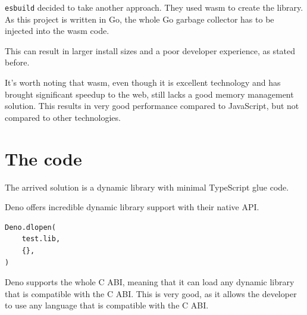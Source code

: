 \documentclass[10pt,journal,compsoc]{IEEEtran}
\begin{document}
\verb|esbuild| decided to take another approach. They used wasm \cite{WASM} to create the library. As this project is written in Go, the whole Go garbage collector has to be injected into the wasm code.

This can result in larger install sizes and a poor developer experience, as stated before.

It's worth noting that wasm, even though it is excellent technology and has brought significant speedup to the web, still lacks a good memory management solution. This results in very good performance compared to JavaScript, but not compared to other technologies.

\section{The code}

The arrived solution is a dynamic library with minimal TypeScript glue code.

Deno offers incredible dynamic library support with their native API.

\begin{lstlisting}
Deno.dlopen(
    test.lib,
    {},
)
\end{lstlisting}

Deno supports the whole C ABI, meaning that it can load any dynamic library that is compatible with the C ABI. This is very good, as it allows the developer to use any language that is compatible with the C ABI.
\end{document}
